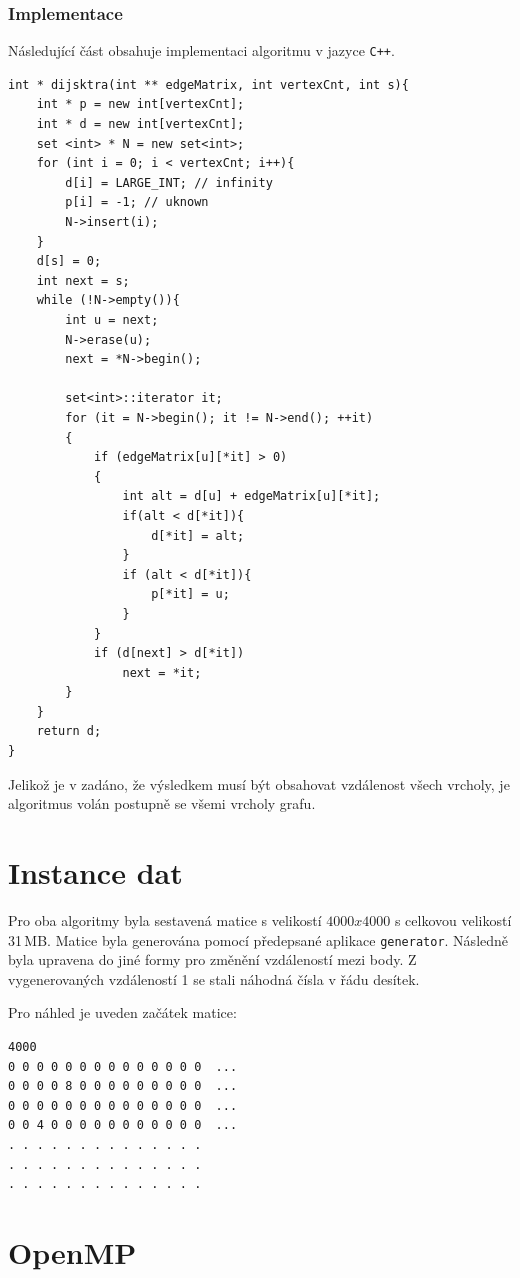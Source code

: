 \documentclass[a4paper,10pt]{article}
\begin{document}
\subsubsection{Implementace}

Následující část obsahuje implementaci algoritmu v jazyce \texttt{C++}.

\begin{verbatim}
int * dijsktra(int ** edgeMatrix, int vertexCnt, int s){
    int * p = new int[vertexCnt];
    int * d = new int[vertexCnt];
    set <int> * N = new set<int>;
    for (int i = 0; i < vertexCnt; i++){
        d[i] = LARGE_INT; // infinity
        p[i] = -1; // uknown
        N->insert(i);
    }
    d[s] = 0;
    int next = s;
    while (!N->empty()){
        int u = next;
        N->erase(u);
        next = *N->begin();

        set<int>::iterator it;
        for (it = N->begin(); it != N->end(); ++it)
        {
            if (edgeMatrix[u][*it] > 0)
            {
                int alt = d[u] + edgeMatrix[u][*it];
				if(alt < d[*it]){
					d[*it] = alt;
				}
                if (alt < d[*it]){
                    p[*it] = u;
                }
            }
            if (d[next] > d[*it])
                next = *it;
        }
    }
    return d;
}
\end{verbatim}

Jelikož je v zadáno, že výsledkem musí být obsahovat vzdálenost všech vrcholy, je algoritmus volán postupně se všemi vrcholy grafu.

\section{Instance dat}

Pro oba algoritmy byla sestavená matice s velikostí $4000x4000$ s celkovou velikostí 31\,MB. Matice byla generována pomocí předepsané aplikace \texttt{generator}. Následně byla upravena do jiné formy pro změnění vzdáleností mezi body. Z vygenerovaných vzdáleností 1 se stali náhodná čísla v řádu desítek.

Pro náhled je uveden začátek matice:

\begin{verbatim}
4000
0 0 0 0 0 0 0 0 0 0 0 0 0 0  ...
0 0 0 0 8 0 0 0 0 0 0 0 0 0  ...
0 0 0 0 0 0 0 0 0 0 0 0 0 0  ...
0 0 4 0 0 0 0 0 0 0 0 0 0 0  ...
. . . . . . . . . . . . . . 
. . . . . . . . . . . . . . 
. . . . . . . . . . . . . . 
\end{verbatim}

\section{OpenMP}
\end{document}
